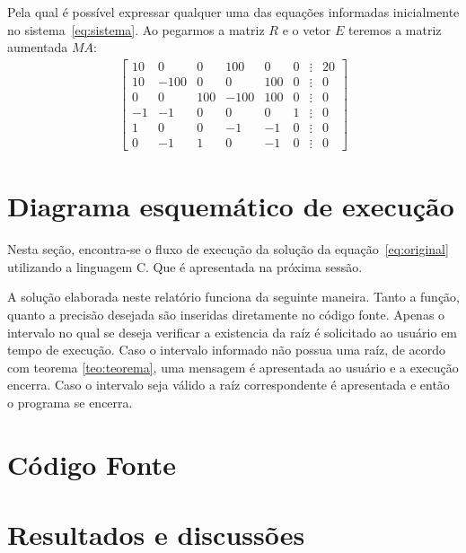 \documentclass[12pt, hidelinks]{article}
\begin{document}
Pela qual é possível expressar qualquer uma das equações informadas inicialmente no sistema~\eqref{eq:sistema}. Ao pegarmos a
matriz $R$ e o vetor $E$ teremos a matriz aumentada $MA$:
\begin{eqnarray}\label{eq:matrizes3}
\left[\begin{array}{rrrrrrrr}
10 & 0 & 0 & 100 & 0 & 0 & \vdots & 20\\
10 & -100 & 0 & 0 & 100 & 0 & \vdots & 0\\
0 & 0 & 100 & -100 & 100 & 0 & \vdots & 0\\
-1 & -1 & 0 & 0 & 0 & 1 & \vdots & 0\\
1 & 0 & 0 & -1 & -1 & 0 & \vdots & 0\\
0 & -1 & 1 & 0 & -1 & 0 & \vdots & 0
\end{array}\right]
\end{eqnarray}

\newpage
\section{Diagrama esquemático de execução}

Nesta seção, encontra-se o fluxo de execução da solução da equação~\eqref{eq:original} utilizando
a linguagem C. Que é apresentada na próxima sessão.


A solução elaborada neste relatório funciona da seguinte maneira. Tanto a função, quanto a precisão
desejada são inseridas diretamente no código fonte. Apenas o intervalo no qual se deseja verificar
a existencia da raíz é solicitado ao usuário em tempo de execução. Caso o intervalo informado não
possua uma raíz, de acordo com teorema \ref{teo:teorema}, uma mensagem é apresentada ao usuário e a
execução encerra. Caso o intervalo seja válido a raíz correspondente é apresentada e então o programa se encerra.

\newpage
\section{Código Fonte}



\newpage
\section{Resultados e discussões}
\end{document}
